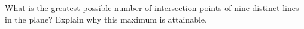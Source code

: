 What is the greatest possible number of intersection points of nine distinct lines in the plane? Explain why this maximum is attainable.
